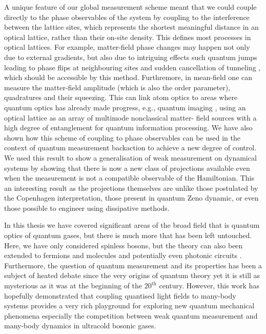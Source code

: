 A unique feature of our global measurement scheme meant that we could
couple directly to the phase observables of the system by coupling to
the interference between the lattice sites, which represents the
shortest meaningful distance in an optical lattice, rather than their
on-site density. This defines most processes in optical lattices.  For
example, matter-field phase changes may happen not only due to
external gradients, but also due to intriguing effects such quantum
jumps leading to phase flips at neighbouring sites and sudden
cancellation of tunneling \cite{vukics2007}, which should be
accessible by this method. Furthremore, in mean-field one can measure
the matter-field amplitude (which is also the order parameter),
quadratures and their squeezing. This can link atom optics to areas
where quantum optics has already made progress, e.g., quantum imaging
\cite{golubev2010, kolobov1999}, using an optical lattice as an array
of multimode nonclassical matter- field sources with a high degree of
entanglement for quantum information processing. We have also shown
how this scheme of coupling to phase observables can be used in the
context of quantum measurement backaction to achieve a new degree of
control. We used this result to show a generalisation of weak
measurement on dynamical systems by showing that there is now a new
class of projections available even when the measurement is not a
compatible observable of the Hamiltonian. This an interesting result
as the projections themselves are unlike those postulated by the
Copenhagen interpretation, those present in quantum Zeno dynamic, or
even those possible to engineer using dissipative methods.

In this thesis we have covered significant areas of the broad field
that is quantum optics of quantum gases, but there is much more that
has been left untouched. Here, we have only considered spinless
bosons, but the theory can also been extended to fermions
\cite{atoms2015, mazzucchi2016, mazzucchi2016af} and molecules
\cite{LP2013} and potentially even photonic circuits
\cite{mazzucchi2016njp}. Furthermore, the question of quantum
measurement and its properties has been a subject of heated debate
since the very origins of quantum theory yet it is still as mysterious
as it was at the beginning of the $20^\mathrm{th}$ century. However,
this work has hopefully demonstrated that coupling quantised light
fields to many-body systems provides a very rich playground for
exploring new quantum mechanical phenomena especially the competition
between weak quantum measurement and many-body dynamics in ultracold
bosonic gases.

